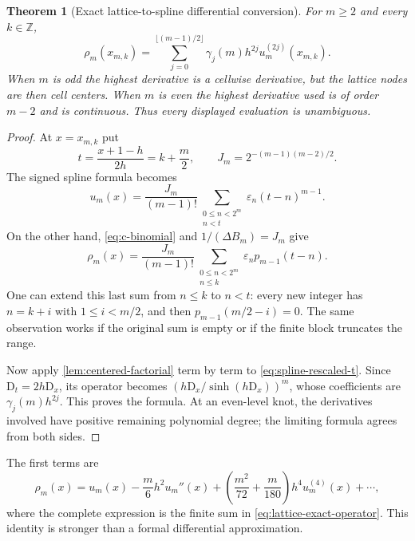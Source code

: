 \documentclass[11pt,a4paper]{article}
\numberwithin{equation}{section}
\newtheorem{theorem}{Theorem}[section]
\theoremstyle{definition}
\newcommand{\Z}{\mathbb Z}
\newcommand{\eps}{\varepsilon}
\newcommand{\D}{\mathrm D}
\begin{document}
\begin{theorem}[Exact lattice-to-spline differential conversion]\label{thm:lattice-operator}
For $m\geq2$ and every $k\in\Z$,
\begin{equation}
 \boxed{\quad
 \rho_m(x_{m,k})=
 \sum_{j=0}^{\lfloor(m-1)/2\rfloor}
        \gamma_j(m)h^{2j}u_m^{(2j)}(x_{m,k}).\quad}
 \label{eq:lattice-exact-operator}
\end{equation}
When $m$ is odd the highest derivative is a cellwise derivative,
but the lattice nodes are then cell centers. When $m$ is even the
highest derivative used is of order $m-2$ and is continuous.
Thus every displayed evaluation is unambiguous.
\end{theorem}
\begin{proof}
At $x=x_{m,k}$ put
\begin{equation}
 t=\frac{x+1-h}{2h}=k+\frac m2,
 \qquad J_m=2^{-(m-1)(m-2)/2}.
\end{equation}
The signed spline formula becomes
\begin{equation}
 u_m(x)=\frac{J_m}{(m-1)!}
       \sum_{\substack{0\leq n<2^m\\n<t}}\eps_n(t-n)^{m-1}.
 \label{eq:spline-rescaled-t}
\end{equation}
On the other hand, \eqref{eq:c-binomial} and
$1/(\Delta B_m)=J_m$ give
\begin{equation}
 \rho_m(x)=\frac{J_m}{(m-1)!}
       \sum_{\substack{0\leq n<2^m\\n\leq k}}\eps_n p_{m-1}(t-n).
 \label{eq:rho-rescaled-t}
\end{equation}
One can extend this last sum from $n\leq k$ to $n<t$: every new
integer has $n=k+i$ with $1\leq i<m/2$, and then
$p_{m-1}(m/2-i)=0$. The same observation works if the original
sum is empty or if the finite block truncates the range.

Now apply \cref{lem:centered-factorial} term by term to
\eqref{eq:spline-rescaled-t}. Since $\D_t=2h\D_x$, its operator
becomes $(h\D_x/\sinh(h\D_x))^m$, whose coefficients are
$\gamma_j(m)h^{2j}$. This proves the formula. At an even-level
knot, the derivatives involved have positive remaining polynomial
degree; the limiting formula agrees from both sides.
\end{proof}

The first terms are
\begin{equation}
 \rho_m(x)=u_m(x)-\frac m6h^2u_m''(x)
        +\left(\frac{m^2}{72}+\frac m{180}\right)h^4u_m^{(4)}(x)
        +\cdots,
 \label{eq:operator-first}
\end{equation}
where the complete expression is the finite sum in
\eqref{eq:lattice-exact-operator}. This identity is stronger than a
formal differential approximation.
\end{document}
